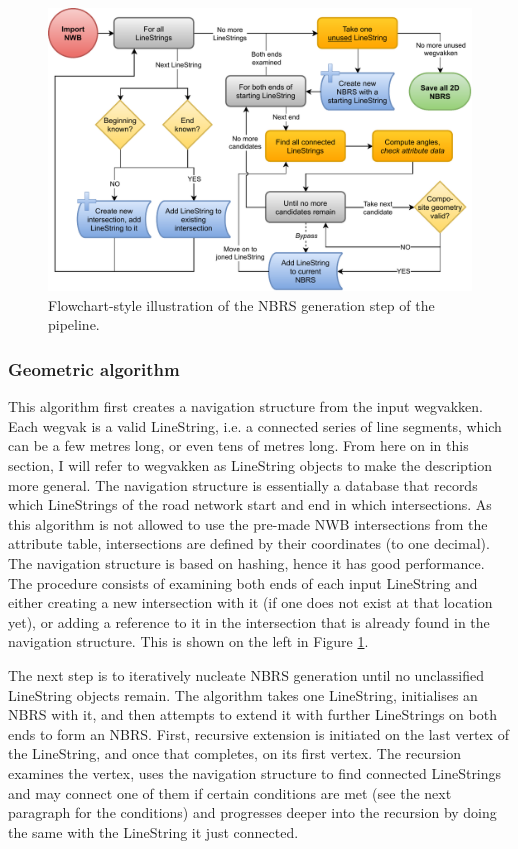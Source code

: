 \begin{figure}
    \centering
    \includegraphics[width=0.9\linewidth]{final_report/figs/nbrs_generation.pdf}
    \caption{Flowchart-style illustration of the NBRS generation step of the pipeline.}
    \label{fig:nbrsgenerationflow}
\end{figure}

\subsubsection{Geometric algorithm}

This algorithm first creates a navigation structure from the input wegvakken. Each wegvak is a valid LineString, i.e. a connected series of line segments, which can be a few metres long, or even tens of metres long. From here on in this section, I will refer to wegvakken as LineString objects to make the description more general. The navigation structure is essentially a database that records which LineStrings of the road network start and end in which intersections. As this algorithm is not allowed to use the pre-made NWB intersections from the attribute table, intersections are defined by their coordinates (to one decimal). The navigation structure is based on hashing, hence it has good performance. The procedure consists of examining both ends of each input LineString and either creating a new intersection with it (if one does not exist at that location yet), or adding a reference to it in the intersection that is already found in the navigation structure. This is shown on the left in Figure \ref{fig:nbrsgenerationflow}.

The next step is to iteratively nucleate NBRS generation until no unclassified LineString objects remain. The algorithm takes one LineString, initialises an NBRS with it, and then attempts to extend it with further LineStrings on both ends to form an NBRS. First, recursive extension is initiated on the last vertex of the LineString, and once that completes, on its first vertex. The recursion examines the vertex, uses the navigation structure to find connected LineStrings and may connect one of them if certain conditions are met (see the next paragraph for the conditions) and progresses deeper into the recursion by doing the same with the LineString it just connected.

